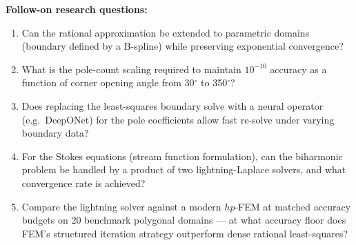 \documentclass[11pt]{article}
\begin{document}
\noindent\textbf{Follow-on research questions:}
\begin{enumerate}[leftmargin=1.6em,itemsep=0.2em,topsep=0.2em,label=Q\arabic*.]
\item Can the rational approximation be extended to parametric domains (boundary defined by a B-spline) while preserving exponential convergence?
\item What is the pole-count scaling required to maintain $10^{-10}$ accuracy as a function of corner opening angle from 30$^\circ$ to 350$^\circ$?
\item Does replacing the least-squares boundary solve with a neural operator (e.g.\ DeepONet) for the pole coefficients allow fast re-solve under varying boundary data?
\item For the Stokes equations (stream function formulation), can the biharmonic problem be handled by a product of two lightning-Laplace solvers, and what convergence rate is achieved?
\item Compare the lightning solver against a modern $hp$-FEM at matched accuracy budgets on 20 benchmark polygonal domains --- at what accuracy floor does FEM's structured iteration strategy outperform dense rational least-squares?
\end{enumerate}
\end{document}
